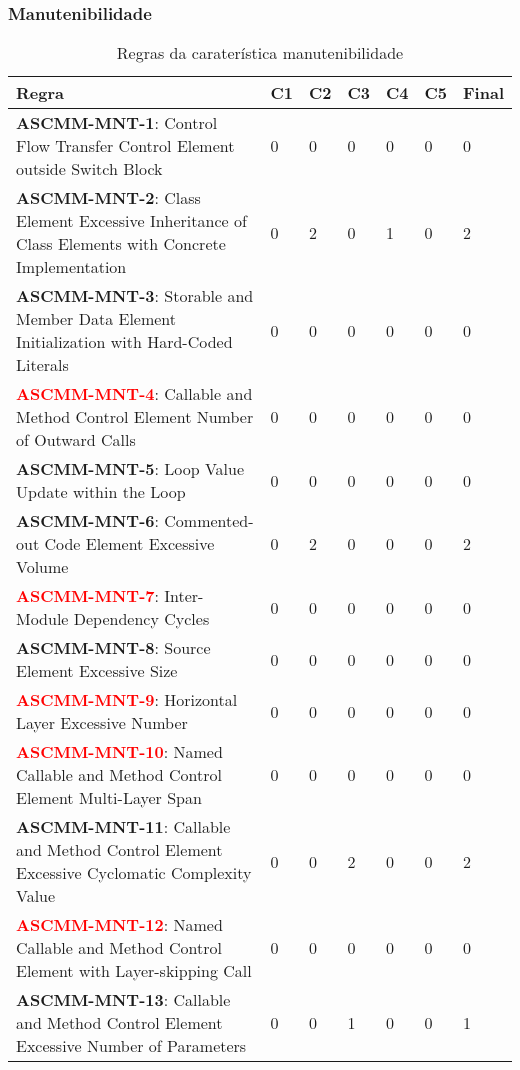 \documentclass[openany,10pt,a4paper]{article}
\begin{document}
\subsubsection{Manutenibilidade}
	\begin{longtable}{p{3.2in}|p{0.28in}|p{0.28in}|p{0.28in}|p{0.28in}|p{0.28in}|p{0.35in}}
		\caption{Regras da caraterística manutenibilidade}
		\label{variability_impl_mech}
		\endhead
		\hline
		\textbf{Regra} & \textbf{C1} & \textbf{C2} & \textbf{C3} & \textbf{C4} & \textbf{C5} & \textbf{Final} \\ \hline
		\textbf{ASCMM-MNT-1}: Control Flow Transfer Control Element outside Switch Block & 0 & 0 & 0 & 0 & 0 & 0 \\ \hline
\textbf{ASCMM-MNT-2}: Class Element Excessive Inheritance of Class Elements with Concrete Implementation & 0 & 2 & 0 & 1 & 0 & 2 \\ \hline
\textbf{ASCMM-MNT-3}: Storable and Member Data Element Initialization with Hard-Coded Literals & 0 & 0 & 0 & 0 & 0 & 0 \\ \hline
\textcolor{red}{\textbf{ASCMM-MNT-4}}: Callable and Method Control Element Number of Outward Calls & 0 & 0 & 0 & 0 & 0 & 0 \\ \hline
\textbf{ASCMM-MNT-5}: Loop Value Update within the Loop & 0 & 0 & 0 & 0 & 0 & 0 \\ \hline
\textbf{ASCMM-MNT-6}: Commented-out Code Element Excessive Volume & 0 & 2 & 0 & 0 & 0 & 2 \\ \hline
\textcolor{red}{\textbf{ASCMM-MNT-7}}: Inter-Module Dependency Cycles & 0 & 0 & 0 & 0 & 0 & 0 \\ \hline
\textbf{ASCMM-MNT-8}: Source Element Excessive Size & 0 & 0 & 0 & 0 & 0 & 0 \\ \hline
\textcolor{red}{\textbf{ASCMM-MNT-9}}: Horizontal Layer Excessive Number & 0 & 0 & 0 & 0 & 0 & 0 \\ \hline
\textcolor{red}{\textbf{ASCMM-MNT-10}}: Named Callable and Method Control Element Multi-Layer Span & 0 & 0 & 0 & 0 & 0 & 0 \\ \hline
\textbf{ASCMM-MNT-11}: Callable and Method Control Element Excessive Cyclomatic Complexity Value & 0 & 0 & 2 & 0 & 0 & 2 \\ \hline
\textcolor{red}{\textbf{ASCMM-MNT-12}}: Named Callable and Method Control Element with Layer-skipping Call & 0 & 0 & 0 & 0 & 0 & 0 \\ \hline
\textbf{ASCMM-MNT-13}: Callable and Method Control Element Excessive Number of Parameters & 0 & 0 & 1 & 0 & 0 & 1 \\ \hline

\end{longtable}
\end{document}
